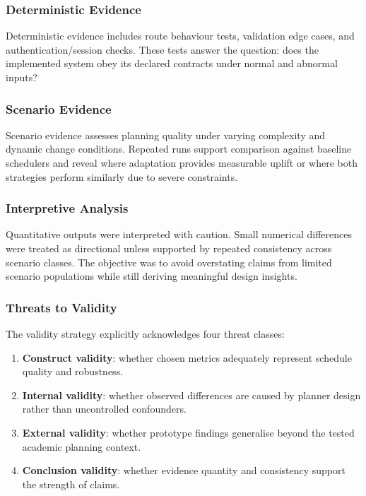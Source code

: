 \documentclass[12pt]{article}
\begin{document}
\subsubsection{Deterministic Evidence}
Deterministic evidence includes route behaviour tests, validation edge cases, and authentication/session checks. These tests answer the question: does the implemented system obey its declared contracts under normal and abnormal inputs?

\subsubsection{Scenario Evidence}
Scenario evidence assesses planning quality under varying complexity and dynamic change conditions. Repeated runs support comparison against baseline schedulers and reveal where adaptation provides measurable uplift or where both strategies perform similarly due to severe constraints.

\subsubsection{Interpretive Analysis}
Quantitative outputs were interpreted with caution. Small numerical differences were treated as directional unless supported by repeated consistency across scenario classes. The objective was to avoid overstating claims from limited scenario populations while still deriving meaningful design insights.

\subsubsection{Threats to Validity}
The validity strategy explicitly acknowledges four threat classes:
\begin{enumerate}
    \item \textbf{Construct validity}: whether chosen metrics adequately represent schedule quality and robustness.
    \item \textbf{Internal validity}: whether observed differences are caused by planner design rather than uncontrolled confounders.
    \item \textbf{External validity}: whether prototype findings generalise beyond the tested academic planning context.
    \item \textbf{Conclusion validity}: whether evidence quantity and consistency support the strength of claims.
\end{enumerate}
\end{document}
